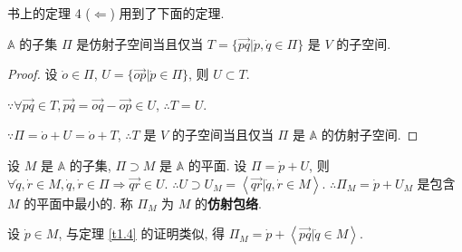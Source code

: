 \documentclass{ctexart}
\begin{document}
书上的定理 4 ($\Leftarrow$) 用到了下面的定理.
\begin{theorem}\label{t1.4}
    $\mathbb{A}$ 的子集 $\varPi$ 是仿射子空间当且仅当 $T=\{\overrightarrow{pq}|\dot{p},\dot{q}\in\varPi\}$ 是 $V$ 的子空间.
\end{theorem}
\begin{proof}
    设 $\dot{o}\in\varPi$, $U=\{\overrightarrow{op}|\dot{p}\in\varPi\}$, 则 $U\subset T$.

    $\because\forall\overrightarrow{pq}\in T,\overrightarrow{pq}=\overrightarrow{oq}-\overrightarrow{op}\in U$, $\therefore T=U$.
    
    $\because\varPi=\dot{o}+U=\dot{o}+T$, $\therefore T$ 是 $V$ 的子空间当且仅当 $\varPi$ 是 $\mathbb{A}$ 的仿射子空间.
\end{proof}
设 $M$ 是 $\mathbb{A}$ 的子集, $\varPi\supset M$ 是 $\mathbb{A}$ 的平面. 设 $\varPi=\dot{p}+U$, 则 $\forall\dot{q},\dot{r}\in M,\dot{q},\dot{r}\in\varPi\Rightarrow\overrightarrow{qr}\in U$. $\therefore U\supset U_M=\left<\overrightarrow{qr}|\dot{q},\dot{r}\in M\right>$. $\therefore\varPi_M=\dot{p}+U_M$ 是包含 $M$ 的平面中最小的. 称 $\varPi_M$ 为 $M$ 的\textbf{仿射包络}.

设 $\dot{p}\in M$, 与定理 \ref{t1.4} 的证明类似, 得 $\varPi_M=\dot{p}+\left<\overrightarrow{pq}|\dot{q}\in M\right>$.
\end{document}
